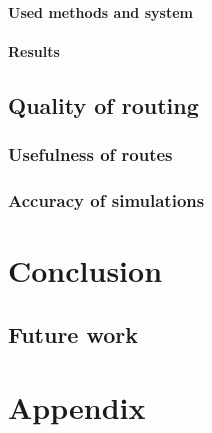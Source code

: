 \documentclass[
	11pt,
	a4paper,
	usegeometry,
	twoside,
	openright,
	toc=chapterentrywithdots
]{scrbook}
\begin{document}
			\subsubsection{Used methods and system}
			
			
			\subsubsection{Results}
		
		\section{Quality of routing}
		
			\subsection{Usefulness of routes}
			
			
			\subsection{Accuracy of simulations}
		
	
	\chapter{Conclusion}
	
		\section{Future work}
		
	\printbibliography

	\printindex
	
	\chapter*{Appendix}
	
		
\end{document}

